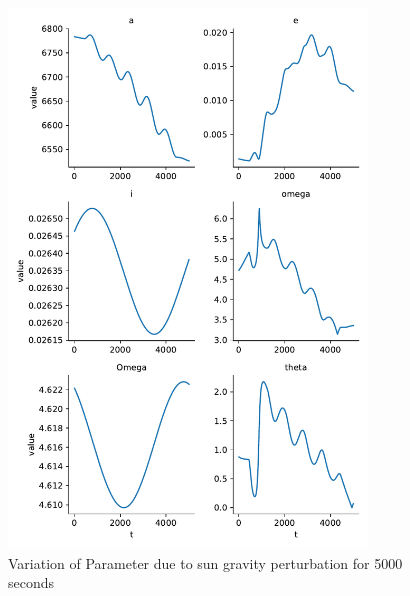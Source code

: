 \begin{figure}[H]
    \centering
    \includegraphics[width=0.85\textwidth]{../Figure/Q2/orbital_elements_variation_sun_5000}
    \caption{Variation of Parameter due to sun gravity perturbation for 5000 seconds}
\end{figure}


